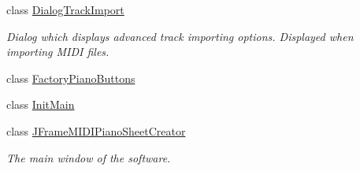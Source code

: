 \begin{DoxyCompactItemize}
class \hyperlink{classcom_1_1lclion_1_1midigui_1_1_dialog_track_import}{Dialog\+Track\+Import}
\begin{DoxyCompactList}\small\item\em Dialog which displays advanced track importing options. Displayed when importing M\+I\+D\+I files. \end{DoxyCompactList}\item 
class \hyperlink{classcom_1_1lclion_1_1midigui_1_1_factory_piano_buttons}{Factory\+Piano\+Buttons}
\item 
class \hyperlink{classcom_1_1lclion_1_1midigui_1_1_init_main}{Init\+Main}
\item 
class \hyperlink{classcom_1_1lclion_1_1midigui_1_1_j_frame_m_i_d_i_piano_sheet_creator}{J\+Frame\+M\+I\+D\+I\+Piano\+Sheet\+Creator}
\begin{DoxyCompactList}\small\item\em The main window of the software. \end{DoxyCompactList}\end{DoxyCompactItemize}
